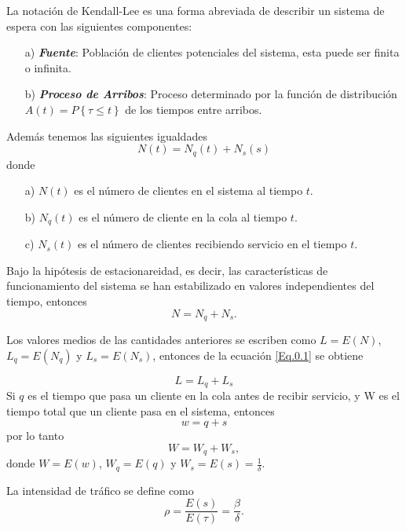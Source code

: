 \documentclass{article}
\numberwithin{equation}{section}
\begin{document}
La notaci\'on de Kendall-Lee es una forma abreviada de describir un sistema de espera con las siguientes componentes:
\begin{itemize}
\item[a)] {\em\bf Fuente}: Poblaci\'on de clientes potenciales del sistema, esta puede ser finita o infinita. 
\item[b)] {\em\bf Proceso de Arribos}: Proceso determinado por la funci\'on de distribuci\'on $A\left(t\right)=P\left\{\tau\leq t\right\}$ de los tiempos entre arribos.
\end{itemize}

Adem\'as tenemos las siguientes igualdades
\begin{equation}\label{Eq.0.1}
N\left(t\right)=N_{q}\left(t\right)+N_{s}\left(s\right)
\end{equation}
donde
\begin{itemize}
\item[a) ] $N\left(t\right)$ es el n\'umero de clientes en el sistema al tiempo $t$. 
\item[b) ] $N_{q}\left(t\right)$ es el n\'umero de cliente en la cola al tiempo $t$.
\item[c) ] $N_{s}\left(t\right)$ es el n\'umero de clientes recibiendo servicio en el tiempo $t$.
\end{itemize}

Bajo la hip\'otesis de estacionareidad, es decir, las caracter\'isticas de funcionamiento del sistema se han estabilizado en valores independientes del tiempo, entonces
\begin{equation}
N=N_{q}+N_{s}.
\end{equation}

Los valores medios de las cantidades anteriores se escriben como $L=E\left(N\right)$, $L_{q}=E\left(N_{q}\right)$ y $L_{s}=E\left(N_{s}\right)$, entonces de la ecuaci\'on \ref{Eq.0.1} se obtiene

\begin{equation}
L=L_{q}+L_{s}
\end{equation}
Si $q$ es el tiempo que pasa un cliente en la cola antes de recibir servicio, y W es el tiempo total que un cliente pasa en el sistema, entonces \[w=q+s\] por lo tanto \[W=W_{q}+W_{s},\] donde $W=E\left(w\right)$, $W_{q}=E\left(q\right)$ y $W_{s}=E\left(s\right)=\frac{1}{\delta}$.

La intensidad de tr\'afico se define como
\begin{equation}
\rho=\frac{E\left(s\right)}{E\left(\tau\right)}=\frac{\beta}{\delta}.
\end{equation}
\end{document}
